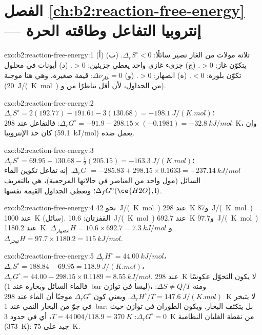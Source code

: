 \section*{الفصل \ref{ch:b2:reaction-free-energy} --- إنتروبيا التفاعل وطاقته الحرة}

\begin{solution}{exo:b2:reaction-free-energy:1}
(أ) ثلاثة مولات من الغاز تصير سائلًا: $\Delta_r S^\circ < 0$. (ب) يتكوّن غاز:
$> 0$. (ج) جزيء غازي واحد يعطي جزيئين: $> 0$. (د) أيونات في محلول
تكوّن بلورة: $< 0$. (ه) انصهار: $> 0$. (و) $\Delta\nu_{\text{غاز}} = 0$:
قيمة صغيرة، وهي هنا موجبة (\qty{+20}{J/(K.mol)} من الجداول، لأن 
أقل تناظرًا من  و).
\end{solution}

\begin{solution}{exo:b2:reaction-free-energy:2}
$\Delta_r S^\circ = 2(192.77) - 191.61 - 3(130.68) = \qty{-198.1}{J/(K.mol)}$؛
$\Delta_r G^\circ = -91.9 - 298.15 \times (-0.1981) = \qty{-32.8}{kJ/mol}$:
فالتفاعل  عند \qty{298}{K}، وإن كان حد الإنتروبيا
(\qty{+59.1}{kJ/mol}) يعمل ضده.
\end{solution}

\begin{solution}{exo:b2:reaction-free-energy:3}
$\Delta_r S^\circ = 69.95 - 130.68 - \tfrac12(205.15) = \qty{-163.3}{J/(K.mol)}$؛
$\Delta_r G^\circ = -285.83 + 298.15 \times 0.1633 = \qty{-237.14}{kJ/mol}$.
إنه تفاعل تكوين الماء السائل (مول واحد من العناصر في حالاتها المرجعية)،
 هي بالتعريف
$\Delta_f G^\circ(\ce{H2O}, \text{l})$؛ وتعطي الجداول القيمة
نفسها.
\end{solution}

\begin{solution}{exo:b2:reaction-free-energy:4}
نحو \qty{42}{J/(K.mol)} عند \qty{298}{K} و\qty{87}{J/(K.mol)} عند
\qty{1000}{K} (سائل). القفزتان: \qty{10.6}{J/(K.mol)} عند \qty{692.7}{K}
و\qty{97.7}{J/(K.mol)} عند \qty{1180.2}{K}. $\Delta_{\text{انصهار}}H = 10.6 \times
692.7 = \qty{7.3}{kJ/mol}$ و$\Delta_{\text{تبخر}}H = 97.7 \times 1180.2 =
\qty{115}{kJ/mol}$.
\end{solution}

\begin{solution}{exo:b2:reaction-free-energy:5}
$\Delta_r H^\circ = \qty{44.00}{kJ/mol}$، $\Delta_r S^\circ = 188.84 - 69.95 =
\qty{118.9}{J/(K.mol)}$، $\Delta_r G^\circ = 44.00 - 298.15 \times 0.1189 =
\qty{+8.55}{kJ/mol}$. عند \qty{298}{K} لا يكون التحوّل عكوسًا (فالماء السائل
وبخاره عند \qty{1}{bar} ليسا في توازن)، ومنه $\Delta S \ne
Q/T$: $\Delta_r H^\circ/T = \qty{147.6}{J/(K.mol)}$. ويعني كون
$\Delta_r G^\circ$ موجبًا أن الماء عند \qty{298}{K} لا يتبخر في جوّ من البخار
النقي عند \qty{1}{bar}: بل يتكثف البخار. ويكون الطوران في توازن حيث
$\Delta_r G^\circ = 0$: $T = 44\,004/118.9 =
\qty{370}{K}$، أي في حدود \qty{3}{K} من نقطة الغليان النظامية
(\qty{373}{K}):  جيد على \qty{75}{K}.
\end{solution}

